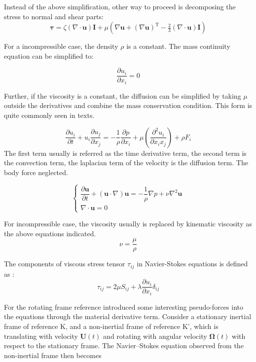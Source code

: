 \documentclass{article}
\begin{document}
Instead of the above simplification, other way to proceed is decomposing the stress to normal and shear parts: 
\begin{equation}
\boldsymbol {\tau }=\zeta (\nabla \cdot \mathbf {u} )\mathbf {I} +\mu \left(\nabla \mathbf {u} +(\nabla \mathbf {u} )^{\mathrm {T} }-{\tfrac {2}{3}}(\nabla \cdot \mathbf {u} )\mathbf {I} \right)
\end{equation}

For a incompressible case, the density $\rho$ is a constant. The mass continuity equation can be simplified to: 

\begin{equation}
\frac{\partial u_i}{\partial x_i} = 0
\end{equation}

Further, if the viscosity is a constant, the diffusion can be simplified by taking $\mu$ outside the derivatives and combine the mass conservation condition. This form is quite commonly seen in texts.

\begin{equation}
\frac{\partial u_i}{\partial t} +  u_i \frac{\partial  u_j}{\partial x_j} = -\frac{1}{\rho} \frac{\partial p}{\partial x_i} + \mu\left( \frac{\partial^2 u_i }{\partial x_i x_j }\right) + \rho F_i
\end{equation}
The first term usually is referred as the time derivative term, the second term is the convection term, the laplacian term of the velocity is the diffusion term. The body force neglected.

\begin{equation}
\begin{cases}
   \dfrac{\partial \mathbf{u}}{\partial t} + \left(\mathbf{u} \cdot \nabla \right) \mathbf{u}  = -\dfrac{1}{\rho} \nabla p + \nu \nabla ^2 \mathbf{u}        \\
 \nabla \cdot \mathbf{u}  = 0
\end{cases}
\end{equation}

For incompressible case, the viscosity usually is replaced by kinematic viscosity as the above equations indicated.
$$
\nu = \frac{\mu}{\rho}
$$

The components of viscous stress tensor $\tau_{ij}$ in Navier-Stokes equations is defined as :
\begin{equation}
\tau_{ij} = 2\mu S_{ij} + \lambda \frac{\partial u_i}{\partial x_i} \delta_{ij}
\end{equation}

For the rotating frame reference introduced some interesting pseudo-forces into the equations through the material derivative term. Consider a stationary inertial frame of reference K, and a non-inertial frame of reference K', which is translating with velocity $\mathbf{U}(t)$ and rotating with angular velocity $\mathbf{\Omega}(t)$ with respect to the stationary frame. The Navier–Stokes equation observed from the non-inertial frame then becomes
\end{document}
